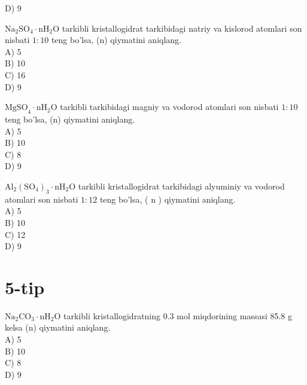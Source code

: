 D) 9
  \item $\mathrm{Na}_{2} \mathrm{SO}_{4} \cdot \mathrm{nH}_{2} \mathrm{O}$ tarkibli kristallogidrat tarkibidagi natriy va kislorod atomlari son nisbati $1: 10$ teng bo'lsa, (n) qiymatini aniqlang.\\
A) 5\\
B) 10\\
C) 16\\
D) 9
  \item $\mathrm{MgSO}_{4} \cdot \mathrm{nH}_{2} \mathrm{O}$ tarkibli tarkibidagi magniy va vodorod atomlari son nisbati $1: 10$ teng bo'lsa, (n) qiymatini aniqlang.\\
A) 5\\
B) 10\\
C) 8\\
D) 9
  \item $\mathrm{Al}_{2}\left(\mathrm{SO}_{4}\right)_{3} \cdot \mathrm{nH}_{2} \mathrm{O}$ tarkibli kristallogidrat tarkibidagi alyuminiy va vodorod atomlari son nisbati $1: 12$ teng bo'lsa, ( n ) qiymatini aniqlang.\\
A) 5\\
B) 10\\
C) 12\\
D) 9


\section*{5-tip}

  \setcounter{enumi}{40}
  \item $\mathrm{Na}_{2} \mathrm{CO}_{3} \cdot \mathrm{nH}_{2} \mathrm{O}$ tarkibli kristallogidratning 0.3 mol miqdorining massasi 85.8 g kelsa (n) qiymatini aniqlang.\\
A) 5\\
B) 10\\
C) 8\\
D) 9\\

